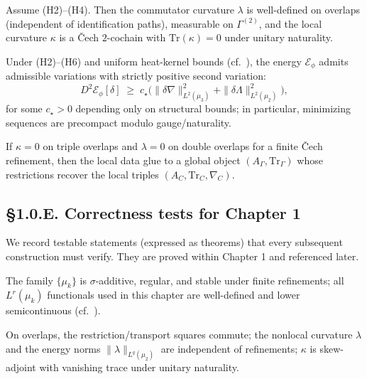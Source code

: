 \begin{theorem}\label{thm:1.0.compat}
Assume \textup{(H2)}–\textup{(H4)}. 
Then the commutator curvature $\lambda$ is well-defined on overlaps (independent of identification paths), measurable on $\Gamma^{(2)}$, and the local curvature $\kappa$ is a Čech $2$-cochain with $\mathrm{Tr}(\kappa)=0$ under unitary naturality. 
\end{theorem}

\begin{theorem}\label{thm:1.0.coerc}
Under \textup{(H2)}–\textup{(H6)} and uniform heat-kernel bounds (cf.\ \cite{Grigoryan,Davies,Hormander1}), the energy $\mathcal E_\phi$ admits admissible variations with strictly positive second variation:
\[
D^2\mathcal E_\phi[\delta] \;\ge\; c_\star\Big(\|\delta\nabla\|_{L^2(\mu_3)}^2 + \|\delta\Lambda\|_{L^2(\mu_2)}^2\Big),
\]
for some $c_\star>0$ depending only on structural bounds; in particular, minimizing sequences are precompact modulo gauge/naturality.
\end{theorem}

\begin{corollary}\label{cor:1.0.descent}
If $\kappa=0$ on triple overlaps and $\lambda=0$ on double overlaps for a finite Čech refinement, then the local data glue to a global object $(A_\Gamma,\mathrm{Tr}_\Gamma)$ whose restrictions recover the local triples $(A_C,\mathrm{Tr}_C,\nabla_C)$.
\end{corollary}

\subsection*{§1.0.E. Correctness tests for Chapter 1}
We record testable statements (expressed as theorems) that every subsequent construction must verify. 
They are proved within Chapter 1 and referenced later.

\begin{theorem}[CT–Measure]\label{ct:1.0.measure}
The family $\{\mu_k\}$ is $\sigma$-additive, regular, and stable under finite refinements; all $L^r(\mu_k)$ functionals used in this chapter are well-defined and lower semicontinuous (cf.\ \cite{Halmos,Bogachev1}).
\end{theorem}

\begin{theorem}[CT–Compatibility]\label{ct:1.0.compat}
On overlaps, the restriction/transport squares commute; the nonlocal curvature $\lambda$ and the energy norms $\|\lambda\|_{L^q(\mu_2)}$ are independent of refinements; $\kappa$ is skew-adjoint with vanishing trace under unitary naturality.
\end{theorem}

